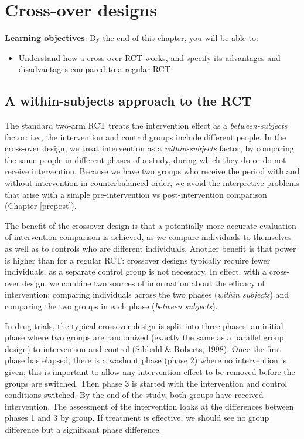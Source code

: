 \documentclass{krantz}
\providecommand{\tightlist}{%
\setlength{\itemsep}{0pt}\setlength{\parskip}{0pt}}
\begin{document}
\hypertarget{crossover}{%
\chapter{Cross-over designs}\label{crossover}}

\textbf{Learning objectives}: By the end of this chapter, you will be able to:

\begin{itemize}
\tightlist
\item
  Understand how a cross-over RCT works, and specify its advantages and disadvantages compared to a regular RCT
\end{itemize}

\hypertarget{a-within-subjects-approach-to-the-rct}{%
\section{A within-subjects approach to the RCT}\label{a-within-subjects-approach-to-the-rct}}

The standard two-arm RCT treats the intervention effect as a \emph{between-subjects} factor: i.e., the intervention and control groups include different people. In the cross-over design, we treat intervention as a \emph{within-subjects} factor, by comparing the same people in different phases of a study, during which they do or do not receive intervention. Because we have two groups who receive the period with and without intervention in counterbalanced order, we avoid the interpretive problems that arise with a simple pre-intervention vs post-intervention comparison (Chapter \ref{prepost}).

The benefit of the crossover design is that a potentially more accurate evaluation of intervention comparison is achieved, as we compare individuals to themselves as well as to controls who are different individuals. Another benefit is that power is higher than for a regular RCT: crossover designs typically require fewer individuals, as a separate control group is not necessary. In effect, with a cross-over design, we combine two sources of information about the efficacy of intervention: comparing individuals across the two phases (\emph{within subjects}) and comparing the two groups in each phase (\emph{between subjects}).

In drug trials, the typical crossover design is split into three phases: an initial phase where two groups are randomized (exactly the same as a parallel group design) to intervention and control (\protect\hyperlink{ref-sibbald1998}{Sibbald \& Roberts, 1998}). Once the first phase has elapsed, there is a washout phase (phase 2) where no intervention is given; this is important to allow any intervention effect to be removed before the groups are switched. Then phase 3 is started with the intervention and control conditions switched. By the end of the study, both groups have received intervention. The assessment of the intervention looks at the differences between phases 1 and 3 by group. If treatment is effective, we should see no group difference but a significant phase difference.
\end{document}

